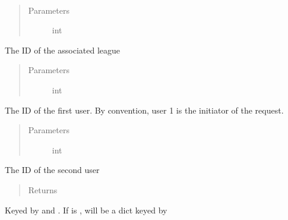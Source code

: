 \documentclass[letterpaper,10pt,english]{sphinxmanual}
\begin{document}
\begin{fulllineitems}
\label{\detokenize{tiger_leagues/models/readme:tiger_leagues.models.league_model.get_player_comparison}}~\begin{quote}\begin{description}
\item[{Parameters}] \leavevmode
{} \textendash{} int

\end{description}\end{quote}

The ID of the associated league
\begin{quote}\begin{description}
\item[{Parameters}] \leavevmode
{} \textendash{} int

\end{description}\end{quote}

The ID of the first user. By convention, user 1 is the initiator of the 
request.
\begin{quote}\begin{description}
\item[{Parameters}] \leavevmode
{} \textendash{} int

\end{description}\end{quote}

The ID of the second user
\begin{quote}\begin{description}
\item[{Returns}] \leavevmode
{}

\end{description}\end{quote}

Keyed by  and . 
If  is ,  will be a dict keyed by 

\end{fulllineitems}
\end{document}
